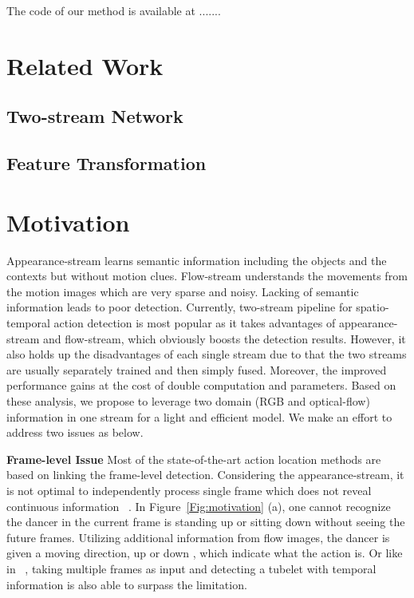 \documentclass[10pt,twocolumn,letterpaper]{article}
\begin{document}
The code of our method is available at .......





\section{Related Work}

\subsection{Two-stream Network}

\subsection{Feature Transformation}
\section{Motivation}
Appearance-stream learns semantic information including the objects and the contexts but without motion clues. Flow-stream understands the movements from the motion images which are very sparse and noisy. Lacking of semantic information leads to poor detection. Currently, two-stream pipeline for spatio-temporal action detection is most popular as it takes advantages of appearance-stream and flow-stream, which obviously boosts the detection results. However, it also holds up the disadvantages of each single stream due to that the two streams are usually separately trained and then simply fused. Moreover, the improved performance gains at the cost of double computation and parameters. Based on these analysis, we propose to leverage two domain (RGB and optical-flow) information in one stream for a light and efficient model. We make an effort to address two issues as below.

{\bf{Frame-level Issue}} Most of the state-of-the-art action location methods are based on linking the frame-level detection. Considering the appearance-stream, it is not optimal to independently process single frame which does not reveal continuous information ~\cite{Kalogeithon2017}. In Figure~\ref{Fig:motivation} (a), one cannot recognize the dancer in the current frame is standing up or sitting down without seeing the future frames. Utilizing additional information from flow images, the dancer is given a moving direction, up  or down , which indicate what the action is. Or like in ~\cite{Kalogeithon2017}, taking multiple frames as input and detecting a tubelet with temporal information is also able to surpass the limitation. 
\end{document}
